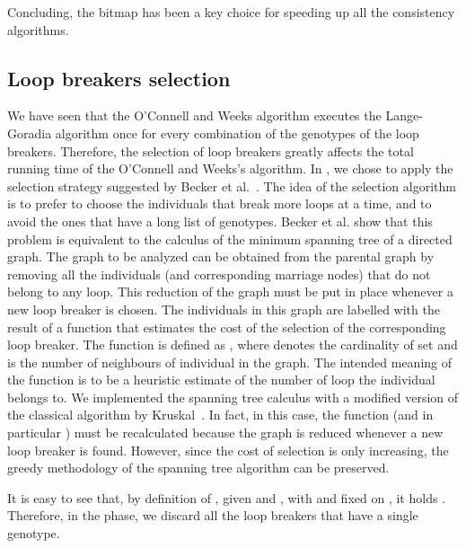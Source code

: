 Concluding, the bitmap has been a key choice for speeding up all the consistency
algorithms.

\subsection{Loop breakers selection}
\label{sec:loop-break-select}
We have seen that the O'Connell and Weeks algorithm executes the Lange-Goradia
algorithm once for every combination of the genotypes of the loop
breakers. Therefore, the selection of loop breakers greatly affects the total
running time of the O'Connell and Weeks's algorithm. In {}, we chose
to apply the selection strategy suggested by Becker et
al.~\cite{loopBecker}. The idea of the selection algorithm is to prefer to
choose the individuals that break more loops at a time, and to avoid the ones
that have a long list of genotypes. Becker et al. show that this problem is
equivalent to the calculus of the minimum spanning tree of a directed graph. The
graph to be analyzed can be obtained from the parental graph by removing all the
individuals (and corresponding marriage nodes) that do not belong to any
loop. This reduction of the graph must be put in place whenever a new loop
breaker is chosen.  The individuals in this graph are labelled with the result
of a function  that estimates the cost of the selection of the corresponding
loop breaker. The function  is defined
as , where  denotes the
cardinality of set  and  is the number of neighbours of individual 
in the graph. The intended meaning of the function  is to be a heuristic
estimate of the number of loop the individual belongs to. We implemented the
spanning tree calculus with a modified version of the classical algorithm by
Kruskal~\cite{kruskal}. In fact, in this case, the function  (and in
particular ) must be recalculated because the graph is reduced whenever a new
loop breaker is found. However, since the cost of selection is only increasing,
the greedy methodology of the spanning tree algorithm can be preserved.

It is easy to see that, by definition of , given  and , with  and  fixed on , it holds . Therefore, in the  phase, we discard all
the loop breakers that have a single genotype. 

